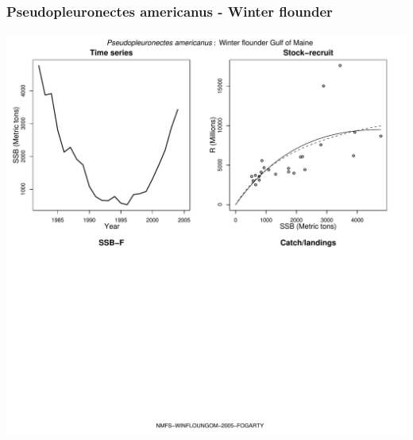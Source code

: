 \subsubsection{Pseudopleuronectes americanus - Winter flounder}
\begin{center}
\includegraphics[width=1.2\textwidth]{../R/figures/NMFS-WINFLOUNGOM-2005-FOGARTY.pdf}
\end{center}

